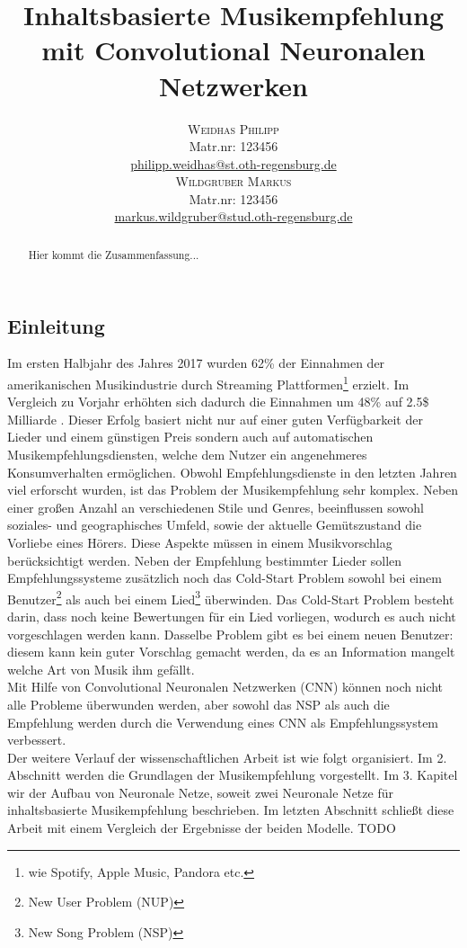 \documentclass[twosided,a4,10pt]{article}
\title{\vspace{-5mm}%
	\fontsize{20pt}{10pt}\selectfont
	\textbf{Inhaltsbasierte Musikempfehlung mit Convolutional Neuronalen Netzwerken}
}
\author{
	\large\begin{minipage}[t]{0.5\linewidth}
		\begin{center}
			\textsc{Weidhas Philipp}\\[2mm]
			\normalsize	Matr.nr: 123456\\
			\normalsize
			\href{mailto:philipp.weidhas@st.oth-regensburg.de}
			{philipp.weidhas@st.oth-regensburg.de}
		\end{center}
	\end{minipage}
	\begin{minipage}[t]{0.5\linewidth}
		\begin{center}
			\textsc{Wildgruber Markus}\\[2mm]
			\normalsize	Matr.nr: 123456\\
			\normalsize
			\href{mailto:markus.wildgruber@stud.oth-regensburg.de}
			{markus.wildgruber@stud.oth-regensburg.de}
		\end{center}
	\end{minipage}
}
\begin{document}
	\maketitle
	\thispagestyle{fancy}
	\begin{multicols}{2}
		\begin{abstract}
			\noindent Hier kommt die Zusammenfassung...
		\end{abstract}
		\section{Einleitung}
		Im ersten Halbjahr des Jahres 2017 wurden 62\% der Einnahmen der amerikanischen Musikindustrie durch Streaming Plattformen\footnote[1]{wie Spotify, Apple Music, Pandora etc.} erzielt. Im Vergleich zu Vorjahr erhöhten sich dadurch die Einnahmen um 48\% auf 2.5\$ Milliarde \cite{friedlander}. Dieser Erfolg basiert nicht nur auf einer guten Verfügbarkeit der Lieder und einem günstigen Preis sondern auch auf automatischen Musikempfehlungsdiensten, welche dem Nutzer ein angenehmeres Konsumverhalten ermöglichen.\newline
		Obwohl Empfehlungsdienste in den letzten Jahren viel erforscht wurden, ist das Problem der Musikempfehlung sehr komplex. Neben einer großen Anzahl an verschiedenen Stile und Genres, beeinflussen sowohl soziales- und geographisches Umfeld, sowie der aktuelle Gemütszustand die Vorliebe eines Hörers. Diese Aspekte müssen in einem Musikvorschlag berücksichtigt werden. \cite{oord}\newline
		Neben der Empfehlung bestimmter Lieder sollen Empfehlungssysteme zusätzlich noch das Cold-Start Problem sowohl bei einem Benutzer\footnote[2]{New User Problem (NUP)} als auch bei einem Lied\footnote[3]{New Song Problem (NSP)} überwinden. Das Cold-Start Problem besteht darin, dass noch keine Bewertungen für ein Lied vorliegen, wodurch es auch nicht vorgeschlagen werden kann. Dasselbe Problem gibt es bei einem neuen Benutzer: diesem kann kein guter Vorschlag gemacht werden, da es an Information mangelt welche Art von Musik ihm gefällt. \cite{celma}\\
		Mit Hilfe von Convolutional Neuronalen Netzwerken (CNN) können noch nicht alle Probleme überwunden werden, aber sowohl das NSP als auch die Empfehlung werden durch die Verwendung eines CNN als Empfehlungssystem verbessert.\newline\\
		Der weitere Verlauf der wissenschaftlichen Arbeit ist wie folgt organisiert. Im 2. Abschnitt werden die Grundlagen der Musikempfehlung vorgestellt. Im 3. Kapitel wir der Aufbau von Neuronale Netze, soweit zwei Neuronale Netze für inhaltsbasierte Musikempfehlung beschrieben. Im letzten Abschnitt schließt diese Arbeit mit einem Vergleich der Ergebnisse der beiden Modelle.
		TODO

\end{multicols}
\end{document}

